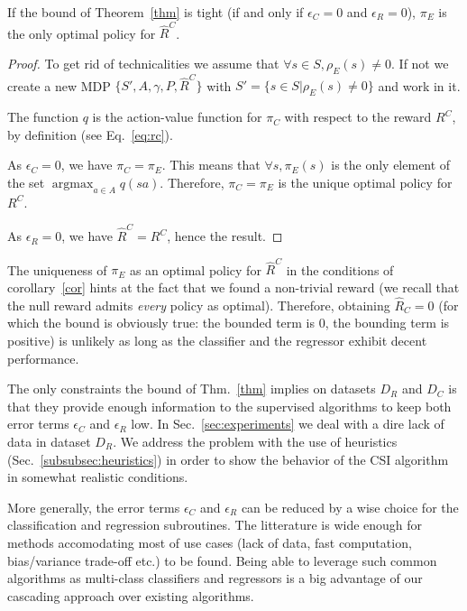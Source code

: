 \documentclass[smallextended]{svjour3}
\newcommand{\argmax}{\operatorname*{argmax}} %
\begin{document}
\begin{corollary}
  \label{cor}
  If the bound of Theorem~\ref{thm} is tight (if and only if $\epsilon_C = 0$ and $\epsilon_R = 0$), $\pi_E$ is the only optimal policy for $\hat R^C$.
\end{corollary}
\begin{proof}
  To get rid of technicalities we assume that $\forall s \in S, \rho_E(s) \neq 0$. If not we create a new MDP $\{S',A,\gamma,P,\hat R^C\}$ with $S' = \{s \in S | \rho_E(s) \neq 0\}$ and work in it.

  The function $q$ is the action-value function for $\pi_C$ with respect to the reward $R^C$, by definition (see Eq.~\eqref{eq:rc}).

  As $\epsilon_C = 0$, we have $\pi_C = \pi_E$. This means that $\forall s, \pi_E(s)$ is the only element of the set $\argmax_{a\in A}q(sa)$. Therefore, $\pi_C = \pi_E$ is the unique optimal policy for $R^C$.

  As $\epsilon_R = 0$, we have $\hat R^C = R^C$, hence the result.
\end{proof}
The uniqueness of $\pi_E$ as an optimal policy for $\hat R^C$ in the conditions of corollary~\ref{cor} hints at the fact that we found a non-trivial reward (we recall that the null reward admits \emph{every} policy as optimal). Therefore, obtaining  $\hat{R}_C = 0$ (for which the bound is obviously true: the bounded term is $0$, the bounding term is positive) is unlikely as long as the classifier and the regressor exhibit decent performance.

The only constraints the bound of Thm.~\ref{thm} implies on datasets $D_R$ and $D_C$ is that they provide enough information to the supervised algorithms to keep both error terms $\epsilon_C$ and $\epsilon_R$ low. In Sec.~\ref{sec:experiments} we deal with a dire lack of data in dataset $D_R$. We address the problem with the use of heuristics (Sec.~\ref{subsubsec:heuristics}) in order to show the behavior of the CSI algorithm in somewhat realistic conditions.

More generally, the error terms  $\epsilon_C$ and $\epsilon_R$ can be reduced by a wise choice for the classification and regression subroutines. The litterature is wide enough for methods accomodating most of use cases (lack of data, fast computation, bias/variance trade-off etc.) to be found. Being able to leverage such common algorithms as multi-class classifiers and regressors is a big advantage of our cascading approach over existing algorithms.
\end{document}
